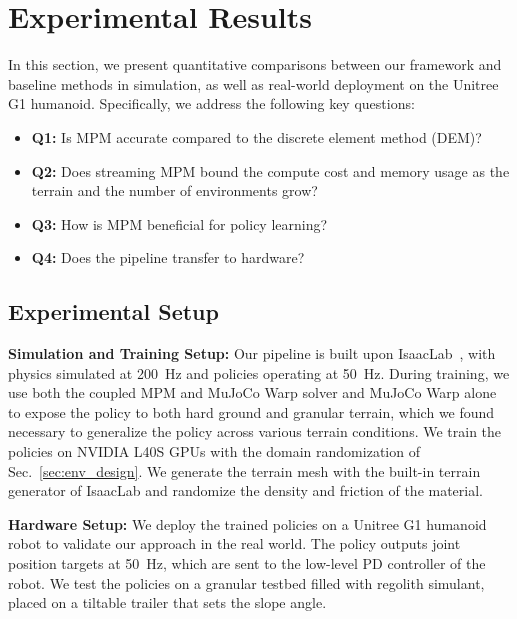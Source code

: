 \section{Experimental Results}
\label{sec:results}
In this section, we present quantitative comparisons between our framework and baseline methods in simulation, as well as real-world deployment on the Unitree G1 humanoid.
Specifically, we address the following key questions:
\begin{itemize}
    \item \textbf{Q1:} Is MPM accurate compared to the discrete element method (DEM)?
    \item \textbf{Q2:} Does streaming MPM bound the compute cost and memory usage as the terrain and the number of environments grow?
    \item \textbf{Q3:} How is MPM beneficial for policy learning?
    \item \textbf{Q4:} Does the pipeline transfer to hardware?
\end{itemize}

\subsection{Experimental Setup}
\textbf{Simulation and Training Setup:}
Our pipeline is built upon IsaacLab~\cite{mittal2025isaaclab}, with physics simulated at 200~Hz and policies operating at 50~Hz.
During training, we use both the coupled MPM and MuJoCo Warp solver and MuJoCo Warp alone to expose the policy to both hard ground and granular terrain, which we found necessary to generalize the policy across various terrain conditions.
We train the policies on NVIDIA L40S GPUs with the domain randomization of Sec.~\ref{sec:env_design}.
We generate the terrain mesh with the built-in terrain generator of IsaacLab and randomize the density and friction of the material.

\textbf{Hardware Setup:}
We deploy the trained policies on a Unitree G1 humanoid robot to validate our approach in the real world.
The policy outputs joint position targets at 50~Hz, which are sent to the low-level PD controller of the robot.
We test the policies on a granular testbed filled with regolith simulant, placed on a tiltable trailer that sets the slope angle.

